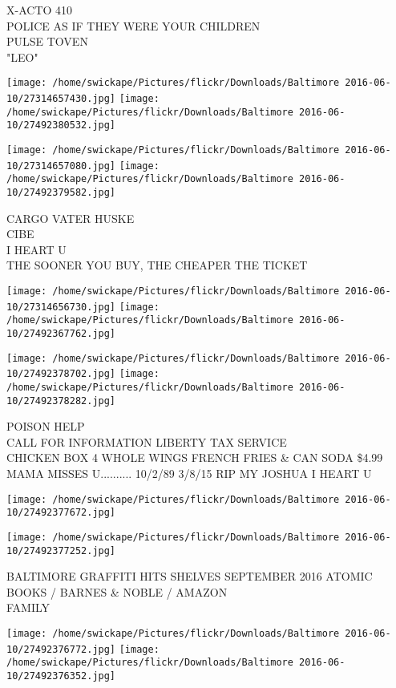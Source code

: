 \documentclass[10pt,letterpaper]{article}
\begin{document}
X{-}ACTO 410\\
POLICE AS IF THEY WERE YOUR CHILDREN\\
PULSE TOVEN\\
"LEO"
\pagebreak

\texttt{[image: /home/swickape/Pictures/flickr/Downloads/Baltimore 2016-06-10/27314657430.jpg]}
\texttt{[image: /home/swickape/Pictures/flickr/Downloads/Baltimore 2016-06-10/27492380532.jpg]}

\texttt{[image: /home/swickape/Pictures/flickr/Downloads/Baltimore 2016-06-10/27314657080.jpg]}
\texttt{[image: /home/swickape/Pictures/flickr/Downloads/Baltimore 2016-06-10/27492379582.jpg]}

CARGO VATER HUSKE\\
CIBE\\
I HEART U\\
THE SOONER YOU BUY, THE CHEAPER THE TICKET
\pagebreak

\texttt{[image: /home/swickape/Pictures/flickr/Downloads/Baltimore 2016-06-10/27314656730.jpg]}
\texttt{[image: /home/swickape/Pictures/flickr/Downloads/Baltimore 2016-06-10/27492367762.jpg]}

\texttt{[image: /home/swickape/Pictures/flickr/Downloads/Baltimore 2016-06-10/27492378702.jpg]}
\texttt{[image: /home/swickape/Pictures/flickr/Downloads/Baltimore 2016-06-10/27492378282.jpg]}

POISON HELP\\
CALL FOR INFORMATION LIBERTY TAX SERVICE\\
CHICKEN BOX 4 WHOLE WINGS FRENCH FRIES \& CAN SODA \$4.99\\
MAMA MISSES U.......... 10/2/89 3/8/15 RIP MY JOSHUA I HEART U
\pagebreak

\texttt{[image: /home/swickape/Pictures/flickr/Downloads/Baltimore 2016-06-10/27492377672.jpg]}

\vspace{0.25in}
\texttt{[image: /home/swickape/Pictures/flickr/Downloads/Baltimore 2016-06-10/27492377252.jpg]}

BALTIMORE GRAFFITI HITS SHELVES SEPTEMBER 2016 ATOMIC BOOKS / BARNES \& NOBLE / AMAZON\\
FAMILY
\pagebreak

\texttt{[image: /home/swickape/Pictures/flickr/Downloads/Baltimore 2016-06-10/27492376772.jpg]}
\texttt{[image: /home/swickape/Pictures/flickr/Downloads/Baltimore 2016-06-10/27492376352.jpg]}
\end{document}
